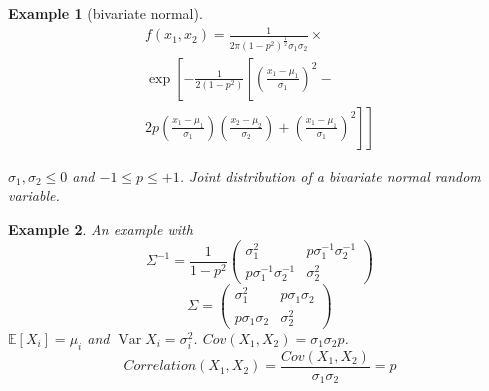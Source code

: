 \documentclass{notes}
\theoremstyle{plain}
\newtheorem*{example}{Example}
\newcommand{\bE}{\mathbb{E}}
\newcommand{\expect}[1]{\bE\!\left[#1\right]}
\DeclareMathOperator{\var}{Var}
\begin{document}
\begin{example}[bivariate normal]
\begin{multline*}
f(x_1,x_2) = \frac{1}{2\pi(1-p^2)^{\frac{1}{2}}\sigma_1\sigma_2}
\times \\
\exp\left[-\frac{1}{2(1-p^2)} \left[\left(\frac{x_1-\mu_1}{\sigma_1}
    \right)^2 - \right.\right. \\
      \left.\left. 2p \left(\frac{x_1-\mu_1}{\sigma_1}\right)
    \left(\frac{x_2-\mu_2}{\sigma_2}
    \right)  +\left(\frac{x_1-\mu_1}{\sigma_1}
    \right)^2  \right] \right]
\end{multline*}

$\sigma_1,\sigma_2 \le 0$ and $ -1 \le p \le +1$. Joint distribution
of a \emph{bivariate normal random variable}.
\end{example}

\begin{example}

An example with 
\[
\Sigma^{-1} = \frac{1}{1-p^2}
\begin{pmatrix}
\sigma_1^2 & p\sigma_1^{-1}\sigma_2^{-1}\\
p\sigma_1^{-1}\sigma_2^{-1} & \sigma_2^2
\end{pmatrix}
\]
\[
\Sigma = 
\begin{pmatrix}
\sigma_1^2 & p\sigma_1\sigma_2\\
p\sigma_1\sigma_2 & \sigma_2^2
\end{pmatrix}
\]
$\expect{X_i} = \mu_i$ and $\var{X_i} = \sigma_i^2$. $Cov(X_1,X_2) =
\sigma_1\sigma_2 p$. 
\[
Correlation(X_1,X_2) = \frac{Cov(X_1,X_2)}{\sigma_1\sigma_2} = p
\]
\end{example}
\end{document}
